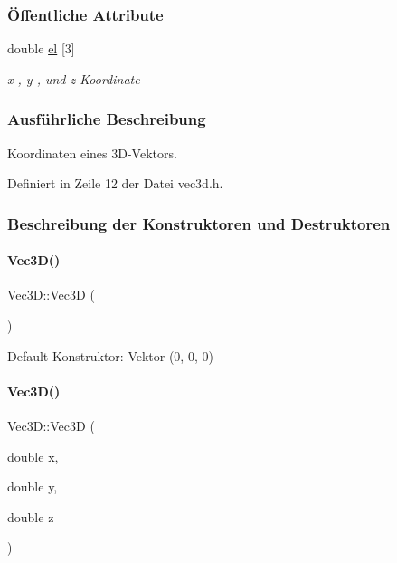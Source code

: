 \subsubsection*{Öffentliche Attribute}
\begin{DoxyCompactItemize}
\item 
double \mbox{\hyperlink{classVec3D_ace4d2f61dbaa70bf6a125514d2d69659}{el}} \mbox{[}3\mbox{]}
\begin{DoxyCompactList}\small\item\em x-\/, y-\/, und z-\/\+Koordinate \end{DoxyCompactList}\end{DoxyCompactItemize}


\subsubsection{Ausführliche Beschreibung}
Koordinaten eines 3\+D-\/\+Vektors. 

Definiert in Zeile 12 der Datei vec3d.\+h.



\subsubsection{Beschreibung der Konstruktoren und Destruktoren}
\mbox{\label{classVec3D_a77e23de6cbc7c3853f8432a017df20b9}} 
\paragraph{\texorpdfstring{Vec3\+D()}{Vec3D()}\hspace{0.1cm}{\footnotesize\ttfamily [1/2]}}
{\footnotesize\ttfamily Vec3\+D\+::\+Vec3D (\begin{DoxyParamCaption}{ }\end{DoxyParamCaption})}



Default-\/\+Konstruktor\+: Vektor (0, 0, 0) 

\mbox{\label{classVec3D_ae51faecba7e72befc56d069d8cd1e3bf}} 
\paragraph{\texorpdfstring{Vec3\+D()}{Vec3D()}\hspace{0.1cm}{\footnotesize\ttfamily [2/2]}}
{\footnotesize\ttfamily Vec3\+D\+::\+Vec3D (\begin{DoxyParamCaption}\item[{double}]{x,  }\item[{double}]{y,  }\item[{double}]{z }\end{DoxyParamCaption})}



